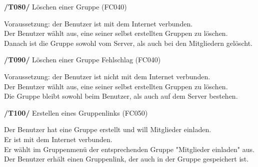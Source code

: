 \textbf{/T080/} Löschen einer Gruppe (FC040)\\
\begin{center}
\vspace{-\parskip}
\begin{minipage}[t]{0.9\textwidth}
Voraussetzung: der Benutzer ist mit dem Internet verbunden.                     \\
Der Benutzer wählt aus, eine seiner selbst erstellten Gruppen zu löschen.        \\
Danach ist die Gruppe sowohl vom Server, als auch bei den Mitgliedern gelöscht.   \\
\end{minipage}
\end{center}

\textbf{/T090/} Löschen einer Gruppe Fehlschlag (FC040)\\
\begin{center}
\vspace{-\parskip}
\begin{minipage}[t]{0.9\textwidth}
Voraussetzung: der Benutzer ist nicht mit dem Internet verbunden.                 \\
Der Benutzer wählt aus, eine seiner selbst erstellten Gruppen zu löschen.          \\
Die Gruppe bleibt sowohl beim Benutzer, als auch auf dem Server bestehen.           \\
\end{minipage}
\end{center}

\textbf{/T100/} Erstellen eines Gruppenlinks (FC050)\\
\begin{center}
\vspace{-\parskip}
\begin{minipage}[t]{0.9\textwidth}
Der Benutzer hat eine Gruppe erstellt und will Mitglieder einladen.      \\
Er ist mit dem Internet verbunden.                                        \\
Er wählt im Gruppenmenü der entsprechenden Gruppe "Mitglieder einladen" aus. \\
Der Benutzer erhält einen Gruppenlink, der auch in der Gruppe gespeichert ist.\\
\end{minipage}
\end{center}

